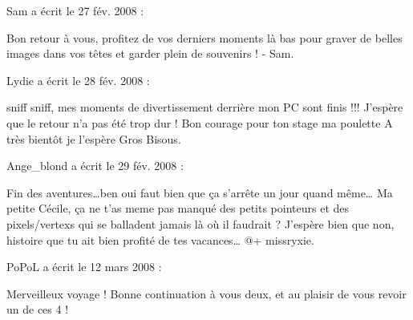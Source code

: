\medskip
Sam a écrit le 27 fév. 2008 :
\begin{displayquote}
Bon retour à vous, profitez de vos derniers moments là bas pour graver de belles images dans vos têtes et garder plein de souvenirs !
- Sam.
\end{displayquote}

\medskip
Lydie a écrit le 28 fév. 2008 :
\begin{displayquote}
sniff sniff, mes moments de divertissement derrière mon PC sont finis !!!
J'espère que le retour n'a pas été trop dur !
Bon courage pour ton stage ma poulette
A très bientôt je l'espère
Gros Bisous.
\end{displayquote}

\medskip
Ange\_blond a écrit le 29 fév. 2008 :
\begin{displayquote}
Fin des aventures\dots ben oui faut bien que ça s'arrête un jour quand même\dots
Ma petite Cécile, ça ne t'as meme pas manqué des petits pointeurs et des pixels/vertexs qui se balladent jamais là où il faudrait ?
J'espère bien que non, histoire que tu ait bien profité de tes vacances\dots
@+ missryxie.
\end{displayquote}

\medskip
PoPoL a écrit le 12 mars 2008 :
\begin{displayquote}
Merveilleux voyage ! Bonne continuation à vous deux, et au plaisir de vous revoir un de ces 4 !
\end{displayquote}

\vfill
